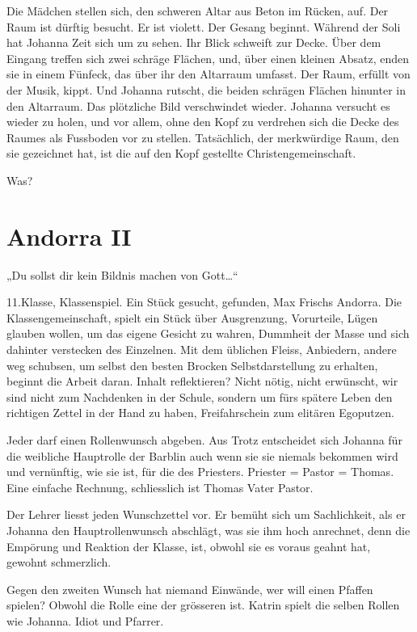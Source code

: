 \documentclass[10pt,titlepage,a5paper]{book}
\begin{document}
Die Mädchen stellen sich, den schweren Altar aus Beton im Rücken, auf. Der Raum ist dürftig besucht. Er ist violett. Der Gesang beginnt. Während der Soli hat Johanna Zeit sich um zu sehen. Ihr Blick schweift zur Decke. Über dem Eingang treffen sich zwei schrä\-ge Flächen, und, über einen kleinen Absatz, enden sie in einem Fünfeck, das über ihr den Altarraum umfasst.
Der Raum, erfüllt von der Musik, kippt. Und Johanna rutscht, die beiden schrägen Flächen hinunter  in den Altarraum. Das plötzliche Bild verschwindet wieder. Johanna versucht es wieder zu holen, und vor allem, ohne den Kopf zu verdrehen sich die Decke des Raumes als Fussboden vor zu stellen. Tatsächlich, der merkwürdige Raum, den sie gezeichnet hat, ist die auf den Kopf gestellte Christengemeinschaft. 

Was?

 
 \section*{Andorra II}
 

 
„Du sollst dir kein Bildnis machen von Gott\dots “

11.Klasse, Klassenspiel. Ein Stück gesucht, gefunden, Max Frischs Andorra. Die Klassengemeinschaft, spielt ein Stück über Ausgrenzung, Vorurteile, Lügen glauben wollen, um das eigene Gesicht zu wahren, Dummheit der Masse und sich dahinter verstecken des Einzelnen. Mit dem üblichen Fleiss, Anbiedern, andere weg schubsen, um selbst den besten Brocken Selbstdarstellung zu erhalten, beginnt die Arbeit daran. Inhalt reflektieren? Nicht nötig, nicht erwünscht, wir sind nicht zum Nachdenken in der Schule, sondern um fürs spätere Leben den richtigen Zettel in der Hand zu haben, Freifahrschein zum elitären Egoputzen.

Jeder darf einen Rollenwunsch abgeben. Aus Trotz entscheidet sich Johanna für die weibliche Hauptrolle der Barblin auch wenn sie sie niemals bekommen wird und vernünftig, wie sie ist, für die des Priesters. Priester = Pastor = Thomas. Eine einfache Rechnung, schliesslich ist Thomas Vater Pastor.

Der Lehrer liesst jeden Wunschzettel vor. Er bemüht sich um Sachlichkeit, als er Johanna den Hauptrollenwunsch abschlägt, was sie ihm hoch anrechnet, denn die Empörung und Reaktion der Klasse, ist, obwohl sie es voraus geahnt hat, gewohnt schmerzlich.

Gegen den zweiten Wunsch hat niemand Einwände, wer will einen Pfaffen spielen? Obwohl die Rolle eine der grösseren ist. Katrin spielt die selben Rollen wie Johanna. Idiot und Pfarrer.
\end{document}
